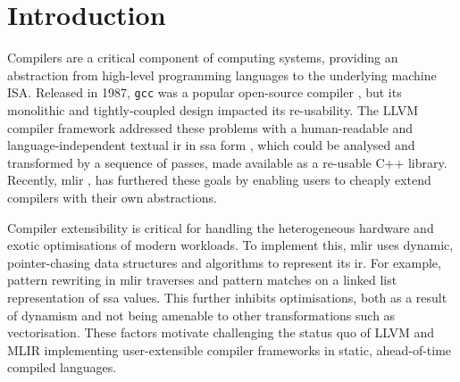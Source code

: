 \chapter{Introduction}
\label{chap:introduction}




Compilers are a critical component of computing systems, providing an abstraction from high-level programming languages to the underlying machine ISA.
Released in 1987, \texttt{gcc} was a popular open-source compiler \cite{stallmanUsingGnuCompiler2009}, but its monolithic and tightly-coupled design impacted its re-usability.
The LLVM compiler framework \cite{lattnerLLVMCompilationFramework2004} addressed these problems with a human-readable and language-independent textual \ac{ir} in \ac{ssa} form \cite{cytronEfficientlyComputingStatic1991}, which could be analysed and transformed by a sequence of passes, made available as a re-usable C++ library.
Recently, \ac{mlir} \cite{lattnerMLIRScalingCompiler2021a}, has furthered these goals by enabling users to cheaply extend compilers with their own abstractions.





Compiler extensibility is critical for handling the heterogeneous hardware and exotic optimisations of modern workloads.
To implement this, \ac{mlir} uses dynamic, pointer-chasing data structures and algorithms to represent its \ac{ir}. For example, pattern rewriting in \ac{mlir} traverses and pattern matches on a linked list representation of \ac{ssa} values.
This further inhibits optimisations, both as a result of dynamism and not being amenable to other transformations such as vectorisation.
These factors motivate challenging the status quo of LLVM and MLIR implementing user-extensible compiler frameworks in static, ahead-of-time compiled languages.




